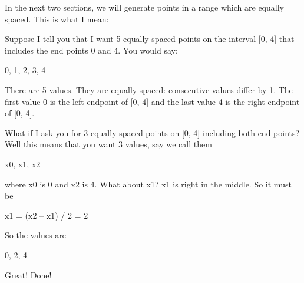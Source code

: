 \newpage{}

In the next two sections, we will generate points in a range which are
equally spaced. This is what I mean:

Suppose I tell you that I want 5 equally spaced points on the interval [0, 4] that includes the end points 0 and 4. You would say:
\begin{center}
0, 1, 2, 3, 4
\end{center}
There are 5 values. They are equally spaced: consecutive values differ
by 1. The first value 0 is the left endpoint of [0, 4] and the last
value 4 is the right endpoint of [0, 4].

What if I ask you for 3 equally spaced points on [0, 4] including
both end points? Well this means that you want 3 values, say we call
them
\begin{center}
x0, x1, x2
\end{center}
where x0 is 0 and x2 is 4. What about x1? x1 is right in the middle. So
it must be
\begin{center}
x1 = (x2 -- x1) / 2 = 2
\end{center}
So the values are
\begin{center}
0, 2, 4
\end{center}
Great! Done!

